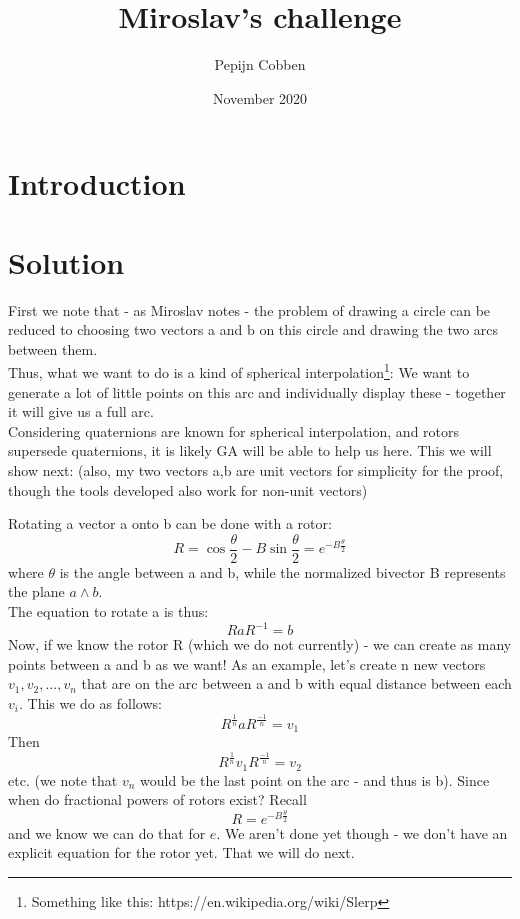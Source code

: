 \documentclass{article}
\title{Miroslav's challenge}
\author{Pepijn Cobben}
\date{November 2020}
\begin{document}
\maketitle

\section{Introduction}

\section{Solution}
First we note that - as Miroslav notes - the problem of drawing a circle can be reduced to choosing two vectors a and b on this circle and drawing the two arcs between them. \\
Thus, what we want to do is a kind of spherical interpolation\footnote{Something like this: https://en.wikipedia.org/wiki/Slerp}: We want to generate a lot of little points on this arc and individually display these - together it will give us a full arc. \\
Considering quaternions are known for spherical interpolation, and rotors supersede quaternions, it is likely GA will be able to help us here. This we will show next: (also, my two vectors a,b are unit vectors for simplicity for the proof, though the tools developed also work for non-unit vectors)\\ \medskip

Rotating a  vector a onto b can be done with a rotor: \begin{equation}
    R = \cos\frac{\theta}{2} - B\sin\frac{\theta}{2} = e^{-B\frac{\theta}{2}}
\end{equation}
where $\theta$ is the angle between a and b, while the normalized bivector B represents the plane $a\wedge b$. \\
The equation to rotate a is thus:
\begin{equation}
    RaR^{-1} = b
\end{equation}
Now, if we know the rotor R (which we do not currently) - we can create as many points between a and b as we want! As an example, let's create n new vectors $v_1, v_2, ..., v_n$ that are on the arc between a and b with equal distance between each $v_i$.
This we do as follows:
\begin{equation}
    R^{\frac{1}{n}}aR^{\frac{-1}{n}} = v_1
\end{equation}
Then
\begin{equation}
    R^{\frac{1}{n}}v_1R^{\frac{-1}{n}} = v_2
\end{equation}
etc. (we note that $v_n$ would be the last point on the arc - and thus is b). Since when do fractional powers of rotors exist? Recall
\begin{equation}
    R = e^{-B\frac{\theta}{2}}
\end{equation}
and we know we can do that for $e$. 
We aren't done yet though - we don't have an explicit equation for the rotor yet. That we will do next. \\
\bigskip
\end{document}
